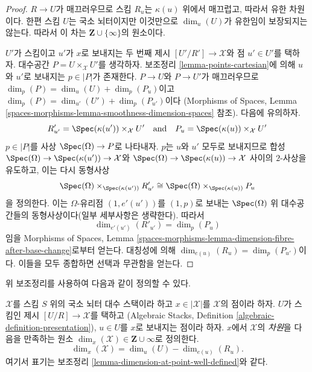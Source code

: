 \begin{proof}
$R \to U$가 매끄러우므로 스킴 $R_u$는 $\kappa(u)$ 위에서 매끄럽고,
따라서 유한 차원이다. 한편 스킴 $U$는 국소 뇌터이지만 이것만으로
$\dim_u(U)$가 유한임이 보장되지는 않는다. 따라서 이 차는
$\mathbf{Z} \cup \{\infty\}$의 원소이다.

\medskip\noindent
$U'$가 스킴이고 $u'$가 $x$로 보내지는 두 번째 제시
$[U'/R'] \to \mathcal{X}$와 점 $u' \in U'$를 택하자.
대수공간 $P = U \times_\mathcal{X} U'$를 생각하자.
보조정리 \ref{lemma-points-cartesian}에 의해 $u$와 $u'$로 보내지는
$p \in |P|$가 존재한다. $P \to U$와 $P \to U'$가 매끄러우므로
$\dim_p(P) = \dim_u(U) + \dim_p(P_u)$이고
$\dim_p(P) = \dim_{u'}(U') + \dim_p(P_{u'})$이다
(Morphisms of Spaces, Lemma
\ref{spaces-morphisms-lemma-smoothness-dimension-spaces} 참조).
다음에 유의하자.
$$
R'_{u'} = \Spec(\kappa(u')) \times_\mathcal{X} U'
\quad\text{and}\quad
P_u = \Spec(\kappa(u)) \times_\mathcal{X} U'
$$
$p \in |P|$를 사상 $\Spec(\Omega) \to P$로 나타내자.
$p$는 $u$와 $u'$ 모두로 보내지므로 합성
$\Spec(\Omega) \to \Spec(\kappa(u')) \to \mathcal{X}$와
$\Spec(\Omega) \to \Spec(\kappa(u)) \to \mathcal{X}$ 사이의
$2$-사상을 유도하고, 이는 다시 동형사상
$$
\Spec(\Omega) \times_{\Spec(\kappa(u'))} R'_{u'}
\cong
\Spec(\Omega) \times_{\Spec(\kappa(u))} P_u
$$
을 정의한다. 이는 $\Omega$-유리점 $(1, e'(u'))$를 $(1, p)$로 보내는
$\Spec(\Omega)$ 위 대수공간들의 동형사상이다(일부 세부사항은 생략한다).
따라서
$$
\dim_{e'(u')}(R'_{u'}) = \dim_p(P_u)
$$
임을 Morphisms of Spaces,
Lemma \ref{spaces-morphisms-lemma-dimension-fibre-after-base-change}로부터 얻는다.
대칭성에 의해 $\dim_{e(u)}(R_u) = \dim_p(P_{u'})$이다.
이들을 모두 종합하면 선택과 무관함을 얻는다.
\end{proof}

\noindent
위 보조정리를 사용하여 다음과 같이 정의할 수 있다.

\begin{definition}
\label{definition-dimension-at-point}
$\mathcal{X}$를 스킴 $S$ 위의 국소 뇌터 대수 스택이라 하고
$x \in |\mathcal{X}|$를 $\mathcal{X}$의 점이라 하자.
$U$가 스킴인 제시 $[U/R] \to \mathcal{X}$를 택하고
(Algebraic Stacks, Definition \ref{algebraic-definition-presentation}),
$u \in U$를 $x$로 보내지는 점이라 하자.
{$x$에서 $\mathcal{X}$의 \it 차원}을 다음을 만족하는 원소
$\dim_x(\mathcal{X}) \in \mathbf{Z} \cup \infty$로 정의한다.
$$
\dim_x(\mathcal{X}) = \dim_u(U)-\dim_{e(u)}(R_u).
$$
여기서 표기는 보조정리 \ref{lemma-dimension-at-point-well-defined}와 같다.
\end{definition}

